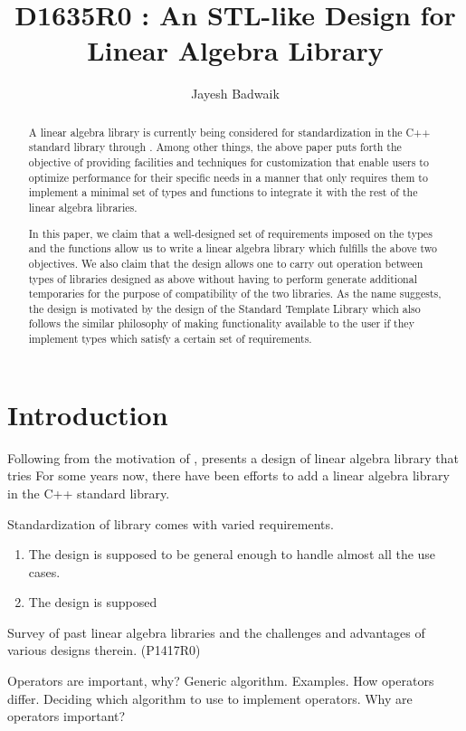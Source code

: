 \documentclass[oneside,11pt,a4paper]{jbarticle}
\subtitle{}
\title{D1635R0 : An STL-like Design for Linear Algebra Library}
\author{Jayesh Badwaik}
\begin{document}
\maketitle[\value{page}]
\begin{abstract}
  A linear algebra library is currently being considered for standardization in
  the C++ standard library through \cite{GuyDavidson2019}. Among other things,
  the above paper puts forth the objective of providing facilities and
  techniques for customization that enable users to optimize performance for
  their specific needs in a manner that only requires them to implement a
  minimal set of types and functions to integrate it with the rest of the linear
  algebra libraries.

  In this paper, we claim that a well-designed set of requirements imposed on
  the types and the functions allow us to write a linear algebra library which
  fulfills the above two objectives.  We also claim that the design allows one
  to carry out operation between types of libraries designed as above without
  having to perform generate additional temporaries for the purpose of
  compatibility of the two libraries. As the name suggests, the design is
  motivated by the design of the Standard Template Library which also follows
  the similar philosophy of making functionality available to the user if they
  implement types which satisfy a certain set of requirements.
\end{abstract}

\section{Introduction}
Following from the motivation of \cite{GuyDavidson2019a},
\cite{GuyDavidson2019a} presents a design of linear algebra library that tries
For some years now, there have been efforts to add a linear algebra library in
the C++ standard library.

Standardization of library comes with varied requirements.
\begin{enumerate}
  \item The design is supposed to be general enough to handle almost all the use
    cases.
  \item The design is supposed
\end{enumerate}

Survey of past linear algebra libraries and the challenges and advantages of
various designs therein. (P1417R0)

Operators are important, why? Generic algorithm. Examples. How operators
differ.  Deciding which algorithm to use to implement operators. Why are
operators important?
\end{document}

